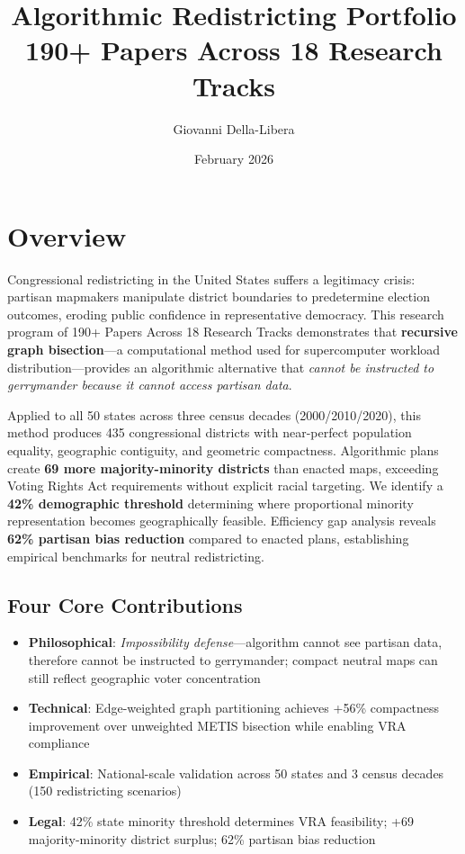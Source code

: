 \documentclass[11pt]{article}
\title{\textbf{Algorithmic Redistricting Portfolio}\\
\large 190+ Papers Across 18 Research Tracks}
\author{Giovanni Della-Libera}
\date{February 2026}
\begin{document}
\maketitle

\section*{Overview}

Congressional redistricting in the United States suffers a legitimacy crisis: partisan mapmakers manipulate district boundaries to predetermine election outcomes, eroding public confidence in representative democracy. This research program of 190+ Papers Across 18 Research Tracks demonstrates that \textbf{recursive graph bisection}---a computational method used for supercomputer workload distribution---provides an algorithmic alternative that \emph{cannot be instructed to gerrymander because it cannot access partisan data}.

Applied to all 50 states across three census decades (2000/2010/2020), this method produces 435 congressional districts with near-perfect population equality, geographic contiguity, and geometric compactness. Algorithmic plans create \textbf{69 more majority-minority districts} than enacted maps, exceeding Voting Rights Act requirements without explicit racial targeting. We identify a \textbf{42\% demographic threshold} determining where proportional minority representation becomes geographically feasible. Efficiency gap analysis reveals \textbf{62\% partisan bias reduction} compared to enacted plans, establishing empirical benchmarks for neutral redistricting.

\subsection*{Four Core Contributions}

\begin{itemize}[leftmargin=*,noitemsep,topsep=4pt]
    \item \textbf{Philosophical}: \emph{Impossibility defense}---algorithm cannot see partisan data, therefore cannot be instructed to gerrymander; compact neutral maps can still reflect geographic voter concentration
    \item \textbf{Technical}: Edge-weighted graph partitioning achieves +56\% compactness improvement over unweighted METIS bisection while enabling VRA compliance
    \item \textbf{Empirical}: National-scale validation across 50 states and 3 census decades (150 redistricting scenarios)
    \item \textbf{Legal}: 42\% state minority threshold determines VRA feasibility; +69 majority-minority district surplus; 62\% partisan bias reduction
\end{itemize}
\end{document}
